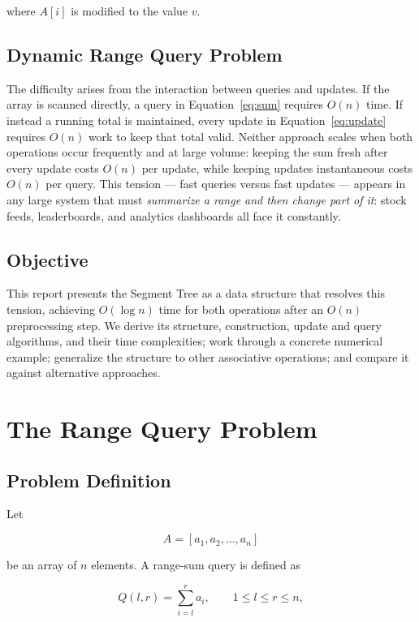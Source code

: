 \documentclass[11pt]{article}
\begin{document}
where $A[i]$ is modified to the value $v$.

\subsection{Dynamic Range Query Problem}
The difficulty arises from the interaction between queries and updates. If the array is scanned directly, a query in Equation~\eqref{eq:sum} requires $O(n)$ time. If instead a running total is maintained, every update in Equation~\eqref{eq:update} requires $O(n)$ work to keep that total valid. Neither approach scales when both operations occur frequently and at large volume: keeping the sum fresh after every update costs $O(n)$ per update, while keeping updates instantaneous costs $O(n)$ per query. This tension --- fast queries versus fast updates --- appears in any large system that must \emph{summarize a range and then change part of it}: stock feeds, leaderboards, and analytics dashboards all face it constantly.

\subsection{Objective}
This report presents the Segment Tree as a data structure that resolves this tension, achieving $O(\log n)$ time for both operations after an $O(n)$ preprocessing step. We derive its structure, construction, update and query algorithms, and their time complexities; work through a concrete numerical example; generalize the structure to other associative operations; and compare it against alternative approaches.

\section{The Range Query Problem}

\subsection{Problem Definition}
Let

\begin{equation}
A = [a_1, a_2, \ldots, a_n]
\end{equation}

be an array of $n$ elements. A range-sum query is defined as

\begin{equation}
Q(l,r) = \sum_{i=l}^{r} a_i, \qquad 1 \le l \le r \le n,
\end{equation}
\end{document}
